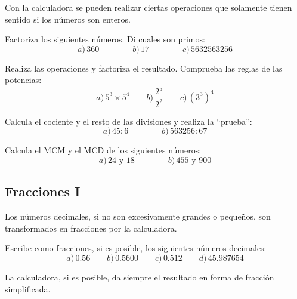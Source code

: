 \documentclass[12pt]{article}
\newenvironment{capitulo}{\begin{tcolorbox}[colback=blue!5!white,colframe=red!75!black]}{\end{tcolorbox}\bigskip}
\newenvironment{ejer}{\begin{tcolorbox}[center title, 
fonttitle=\sffamily\bfseries,colback=blue!5,colframe=orange]}{\end{tcolorbox}}
\begin{document}
Con la calculadora se pueden realizar ciertas operaciones que solamente tienen sentido si los números son enteros.


\bigskip

\begin{ejer}

Factoriza los siguientes números. Di cuales son primos:
\[
a)\, 360 \qquad \qquad b)\, 17 \qquad \qquad c)\, 5632563256
\]

\end{ejer}

\begin{ejer}

Realiza las operaciones y factoriza el resultado. Comprueba las reglas de las potencias:
\[
a)\, 5^3 \times 5^4 \qquad b)\, \frac{2^5}{2^2}\qquad c)\, \left(3^3\right)^4
\]

\end{ejer}

\begin{ejer}

Calcula el cociente y el resto de las divisiones y realiza la ``prueba'':
\[
a)\, 45 : 6 \qquad \qquad  b)\, 563256 :67
\]


\end{ejer}

\begin{ejer}

Calcula el MCM y el MCD de los siguientes números:
\[
a)\, 24\textrm{ y } 18 \qquad \qquad b)\, 455 \textrm{ y  } 900
\]

\end{ejer}


\newpage
\begin{capitulo}
\section*{Fracciones I}
\end{capitulo}

Los números decimales, si no son excesivamente grandes o pequeños, son transformados en fracciones por la calculadora.


\begin{ejer}
Escribe como fracciones, si es posible, los siguientes números decimales:
\[
a)\, 0.56 \qquad b)\, 0.5600 \qquad c)\, 0.512\qquad d)\, 45.987654
\]

\end{ejer}

La calculadora, si es posible, da siempre el resultado en forma de fracción simplificada.
\end{document}
